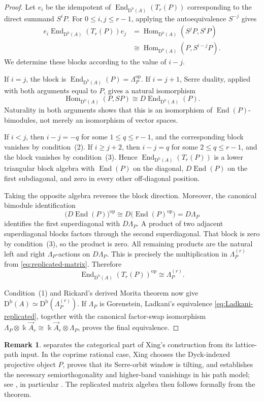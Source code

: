 \documentclass[12pt,a4paper,english,reqno]{amsart}
\theoremstyle{plain}
\theoremstyle{definition}
\newtheorem{remark}[theorem]{Remark}
\newcommand{\kk}{\Bbbk}
\newcommand{\Db}{\mathrm D^{\mathrm b}}
\newcommand{\Hom}{\operatorname{Hom}}
\newcommand{\End}{\operatorname{End}}
\newcommand{\op}{\mathrm{op}}
\begin{document}
\begin{proof}
Let $e_i$ be the idempotent of
$\End_{\Db(A)}(T_r(P))$ corresponding to the direct summand $S^iP$.
For $0\leq i,j\leq r-1$, applying the autoequivalence $S^{-j}$ gives
\[
\begin{split}
 e_i\End_{\Db(A)}(T_r(P))e_j
 &=
 \Hom_{\Db(A)}(S^jP,S^iP)\\
 &\cong
 \Hom_{\Db(A)}(P,S^{i-j}P).
\end{split}
\]
We determine these blocks according to the value of $i-j$.

If $i=j$, the block is $\End_{\Db(A)}(P)=\Lambda_P^{\op}$.
If $i=j+1$, Serre duality, applied with both arguments equal to $P$,
gives a natural isomorphism
\[
 \Hom_{\Db(A)}(P,SP)
 \cong D\End_{\Db(A)}(P).
\]
Naturality in both arguments shows that this is an isomorphism of
$\End(P)$-bimodules, not merely an isomorphism of vector spaces.

If $i<j$, then $i-j=-q$ for some $1\leq q\leq r-1$, and the
corresponding block vanishes by condition~(2).  If $i\geq j+2$, then
$i-j=q$ for some $2\leq q\leq r-1$, and the block vanishes by
condition~(3).  Hence $\End_{\Db(A)}(T_r(P))$ is a lower triangular block
algebra with $\End(P)$ on the diagonal,
$D\End(P)$ on the first subdiagonal, and zero in every other
off-diagonal position.

Taking the opposite algebra reverses the block direction.  Moreover, the
canonical bimodule identification
\[
 \bigl(D\End(P)\bigr)^{\op}
 \cong D\bigl(\End(P)^{\op}\bigr)
 =D\Lambda_P
\]
identifies the first superdiagonal with $D\Lambda_P$.  A product of two
adjacent superdiagonal blocks factors through the second superdiagonal.
That block is zero by condition~(3), so the product is zero.  All remaining
products are the natural left and right $\Lambda_P$-actions on
$D\Lambda_P$.  This is precisely the multiplication in
$\Lambda_P^{(r)}$ from \eqref{eq:replicated-matrix}.  Therefore
\[
 \End_{\Db(A)}(T_r(P))^{\op}\cong\Lambda_P^{(r)}.
\]

Condition~(1) and Rickard's derived Morita theorem now give
$\Db(A)\simeq\Db(\Lambda_P^{(r)})$.  If $\Lambda_P$ is Gorenstein,
Ladkani's equivalence \eqref{eq:Ladkani-replicated}, together with the
canonical factor-swap isomorphism
$\Lambda_P\otimes\kk\vec A_r\cong
\kk\vec A_r\otimes\Lambda_P$, proves the final equivalence.
\end{proof}

\begin{remark}
\label{rem:Xing-vanishing-mechanism}
 separates the categorical part of Xing's
construction from its lattice-path input.  In the coprime rational case,
Xing chooses the Dyck-indexed projective object $P$, proves that its
Serre-orbit window is tilting, and establishes the necessary
semiorthogonality and higher-band vanishings in his path model; see
\cite[Theorem~4.5 and Section~4.4]{Xing}, in particular
\cite[Proposition~4.17 and Corollary~4.21]{Xing}.  The replicated matrix
algebra then follows formally from the theorem.
\end{remark}
\end{document}
